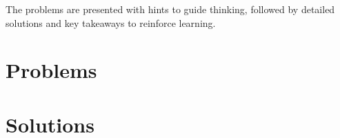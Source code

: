 \documentclass[12pt]{article}
\begin{document}
The problems are presented with hints to guide thinking, followed by detailed solutions and key takeaways to reinforce learning.


\section{Problems}






































\section{Solutions}
\end{document}
